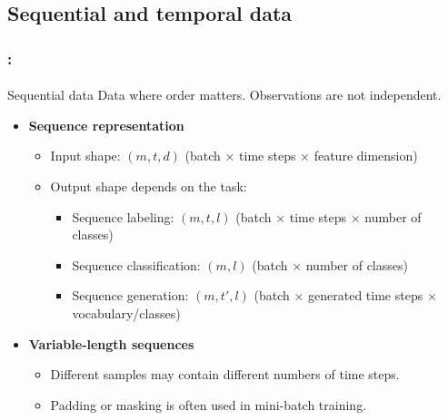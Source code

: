 \documentclass[xcolor=table]{beamer}
\begin{document}
\subsection{Sequential and temporal data}

\begin{frame}
	\frametitle{\insertshortsubtitle: \insertsection}
	\framesubtitle{\insertsubsection}
	
	\begin{block}{Sequential data}
		Data where order matters. Observations are not independent.
	\end{block}
	
	\begin{itemize}
		
		\item \textbf{Sequence representation}
		\begin{itemize}
			\item Input shape: $(m, t, d)$ (batch × time steps × feature dimension)
			
			\item Output shape depends on the task:
			\begin{itemize}
				
				\item Sequence labeling: $(m, t, l)$ (batch × time steps × number of classes)
				
				\item Sequence classification: $(m, l)$ (batch × number of classes)
				
				\item Sequence generation: $(m, t', l)$ (batch × generated time steps × vocabulary/classes)
				
			\end{itemize}
		\end{itemize}
		
		\item \textbf{Variable-length sequences}
		\begin{itemize}
			\item Different samples may contain different numbers of time steps.
			\item Padding or masking is often used in mini-batch training.
		\end{itemize}
		
	\end{itemize}
	
\end{frame}
\end{document}
